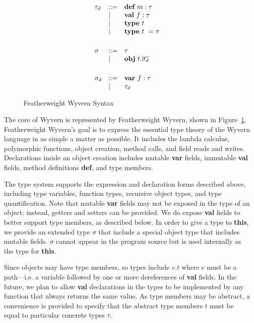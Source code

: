 \documentclass[11pt]{article}
\newcommand{\keyw}[1]{\textbf{#1}}
\begin{document}
\begin{sloppypar}
\begin{figure}
\[\begin{array}{lll}
\tau_d & \bnfdef & \keyw{def}~ m:\tau \\
       & \bnfalt & \keyw{val}~ f:\tau \\
       & \bnfalt & \keyw{type}~ t  \\
       & \bnfalt & \keyw{type}~ t~ = \tau  \\
\\[1ex]

\sigma & \bnfdef & \tau \\
       & \bnfalt & \keyw{obj}~ t . \overline{\sigma_d} \\
\\[1ex]

\sigma_d & \bnfdef & \keyw{var}~ f:\tau \\
         & \bnfalt & \tau_d \\

\end{array}
\]
\caption{Featherweight Wyvern Syntax}
\label{fig:core2-syntax}
\end{figure}

The core of Wyvern is represented by Featherweight Wyvern, shown in Figure~\ref{fig:core2-syntax}.  Featherweight Wyvern's goal is to express the essential type theory of the Wyvern language in as simple a matter as possible.  It includes the lambda calculus, polymorphic functions, object creation, method calls, and field reads and writes.  Declarations inside an object creation includes mutable \keyw{var} fields, immutable \keyw{val} fields, method definitions \keyw{def}, and type members.

The type system supports the expression and declaration forms described above, including type variables, function types, recursive object types, and type quantification.  Note that mutable \keyw{var} fields may not be exposed in the type of an object; instead, getters and setters can be provided.  We do expose \keyw{val} fields to better support type members, as described below.  In order to give a type to \keyw{this}, we provide an extended type $\sigma$ that include a special object type that includes mutable fields.  $\sigma$ cannot appear in the program source but is used internally as the type for \keyw{this}.

Since objects may have type members, so types include $e.t$ where $e$ must be a path---i.e. a variable followed by one or more dereferences of \keyw{val} fields.  In the future, we plan to allow \keyw{val} declarations in the types to be implemented by any function that always returns the same value.  As type members may be abstract, a convenience is provided to specify that the abstract type members $t$ must be equal to particular concrete types $\tau$.


\end{sloppypar}
\end{document}
